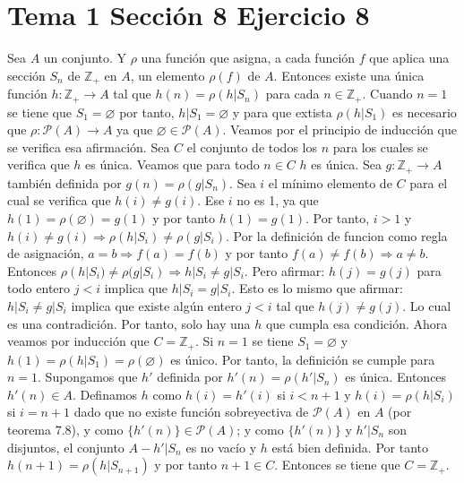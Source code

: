 \documentclass{article}
\begin{document}
\section{Tema 1 Sección 8 Ejercicio 8}
Sea $A$ un conjunto. Y $\rho$ una función que asigna, a cada función $f$ que aplica una sección $S_n$ de $\mathbb{Z}_{+}$ en $A$, un elemento $\rho(f)$ de $A$. Entonces existe una única función $h:\mathbb{Z}_{+}\rightarrow A$ tal que $h(n)=\rho(h|S_n)$ para cada $n\in \mathbb{Z}_{+}$. Cuando $n=1$ se tiene que $S_1=\varnothing$ por tanto, $h|S_1=\varnothing$ y para que extista $\rho(h|S_1)$ es necesario que $\rho:\mathcal{P}(A)\rightarrow A$ ya que $\varnothing \in \mathcal{P}(A)$. Veamos por el principio de inducción que se verifica esa afirmación. Sea $C$ el conjunto de todos los $n$ para los cuales se verifica que $h$ es única. Veamos que para todo $n\in C$ $h$ es única. Sea $g:\mathbb{Z}_{+}\rightarrow A$ también definida por $g(n)=\rho(g|S_n)$. Sea $i$ el mínimo elemento de $C$ para el cual se verifica que $h(i)\neq g(i)$. Ese $i$ no es 1, ya que $h(1)=\rho(\varnothing)=g(1)$ y por tanto $h(1)=g(1)$. Por tanto, $i>1$ y $h(i)\neq g(i)\Rightarrow\rho(h|S_i)\neq\rho(g|S_i)$. Por la definición de funcion como regla de asignación, $a=b\Rightarrow f(a)=f(b)$ y por tanto $f(a)\neq f(b)\Rightarrow a\neq b$. Entonces $\rho(h|S_i)\neq\rho(g|S_i)\Rightarrow h|S_i\neq g|S_i$. Pero afirmar: $h(j)=g(j)$ para todo  entero $j<i$ implica que $h|S_i=g|S_i$. Esto es lo mismo que afirmar: $h|S_i\neq g|S_i$ implica que existe algún entero $j<i$ tal que $h(j)\neq g(j)$. Lo cual es una contradición. Por tanto, solo hay una $h$ que cumpla esa condición. Ahora veamos por inducción que $C=\mathbb{Z}_{+}$. Si $n=1$ se tiene $S_1=\varnothing$ y $h(1)=\rho(h|S_1)=\rho(\varnothing)$ es único. Por tanto, la definición se cumple para $n=1$. Supongamos que $h'$ definida por $h'(n)=\rho(h'|S_n)$ es única. Entonces $h'(n)\in A$. Definamos $h$ como $h(i)=h'(i)$ si $i<n+1$ y $h(i)=\rho(h|S_i)$ si $i=n+1$ dado que no existe función sobreyectiva de $\mathcal{P}(A)$ en $A$ (por teorema 7.8), y como $\{h'(n)\}\in\mathcal{P}(A)$; y como $\{h'(n)\}$ y $h'|S_n$ son disjuntos, el conjunto $A-h'|S_n$ es no vacío y $h$ está bien definida. Por tanto $h(n+1)=\rho(h|S_{n+1})$ y por tanto $n+1\in C$. Entonces se tiene que $C=\mathbb{Z}_{+}$.
%
%
\end{document}
